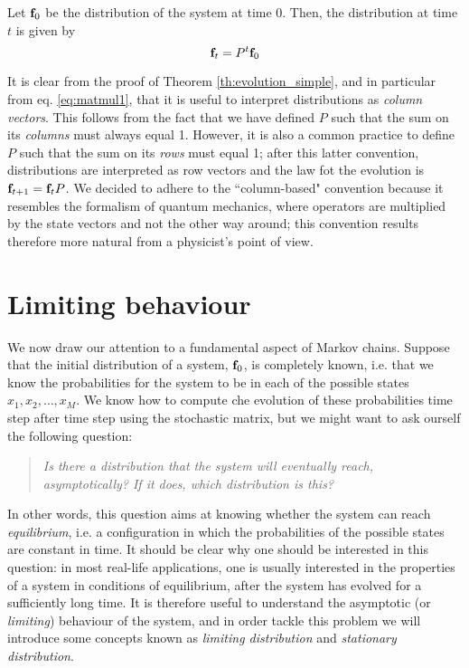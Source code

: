 \begin{corollary} \label{th:evolution_complete}
    Let $\mathbf{f}_0$ be the distribution of the system at time 0. Then, the distribution at time $t$ is given by
    \begin{equation}
        \mathbf{f}_t = P^t \mathbf{f}_0
    \end{equation}
\end{corollary}

\begin{remark}
    It is clear from the proof of Theorem \ref{th:evolution_simple}, and in particular from eq. \ref{eq:matmul1}, that it is useful to interpret distributions as \emph{column vectors}. This follows from the fact that we have defined $P$ such that the sum on its \emph{columns} must always equal 1. However, it is also a common practice to define $P$ such that the sum on its \emph{rows} must equal 1; after this latter convention, distributions are interpreted as row vectors and the law fot the evolution is $\mathbf{f}_{t+1} = \mathbf{f}_t P$. We decided to adhere to the ``column-based" convention because it resembles the formalism of quantum mechanics, where operators are multiplied by the state vectors and not the other way around; this convention results therefore more natural from a physicist's point of view.
\end{remark}

\section{Limiting behaviour}
We now draw our attention to a fundamental aspect of Markov chains. Suppose that the initial distribution of a system, $\mathbf{f}_0$, is completely known, i.e. that we know the probabilities for the system to be in each of the possible states $x_1, x_2, \dots, x_M$. We know how to compute che evolution of these probabilities time step after time step using the stochastic matrix, but we might want to ask ourself the following question:
\begin{quote}
    \emph{Is there a distribution that the system will eventually reach, asymptotically? If it does, which distribution is this?}
\end{quote}
In other words, this question aims at knowing whether the system can reach \emph{equilibrium}, i.e. a configuration in which the probabilities of the possible states are constant in time.
It should be clear why one should be interested in this question: in most real-life applications, one is usually interested in the properties of a system in conditions of equilibrium, after the system has evolved for a sufficiently long time. It is therefore useful to understand the asymptotic (or \emph{limiting}) behaviour of the system, and in order tackle this problem we will introduce some concepts known as \emph{limiting distribution} and \emph{stationary distribution}.

